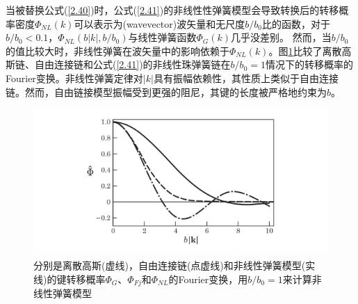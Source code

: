 当被替换公式(\ref{2.40})时，公式(\ref{2.41})的非线性性弹簧模型会导致转换后的转移概率密度$\varPhi_{NL}(k)$可以表示为(wavevector)波矢量和无尺度$b/b_{0}$比的函数，对于$b/b_{0}<0.1$，$\varPhi_{NL}(b|k|,b/b_{0})$与线性弹簧函数$\varPhi_{G}(k)$几乎没差别。 然而，当$b/b_{0}$的值比较大时，非线性弹簧在波矢量中的影响依赖于$\varPhi_{NL}(k)$。图\ref{figures24}比较了离散高斯链、自由连接链和公式(\ref{2.41})的非线性珠弹簧链在$b/b_{0}=1$情况下的转移概率的Fourier变换。非线性弹簧定律对$|k|$具有振幅依赖性，其性质上类似于自由连接链。然而，自由链接模型振幅受到更强的阻尼，其键的长度被严格地约束为$b$。
\begin{figure}[H]
\centering
\includegraphics[width=15cm]{Contents/chapter2/figures/24.png}
\caption{分别是离散高斯(虚线)，自由连接链(点虚线)和非线性弹簧模型(实线)的键转移概率$\varPhi_{G}$、$\varPhi_{Fj}$和$\varPhi_{NL}$的Fourier变换，用$b/b_{0}=1$来计算非线性弹簧模型}
\label{figures24}
\end{figure}
